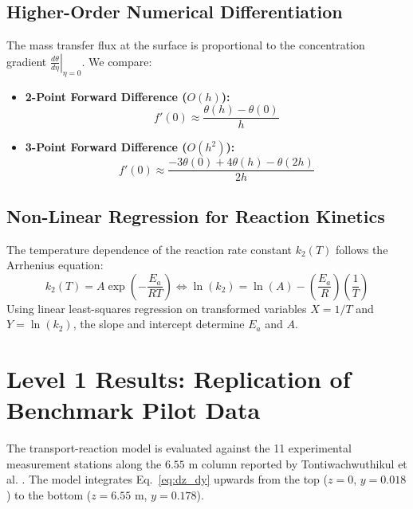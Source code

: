 \documentclass[11pt,a4paper]{article}
\begin{document}
\subsection{Higher-Order Numerical Differentiation}
The mass transfer flux at the surface is proportional to the concentration gradient $\left. \frac{d\theta}{d\eta} \right|_{\eta=0}$. We compare:
\begin{itemize}
    \item \textbf{2-Point Forward Difference ($O(h)$):}
    \begin{equation}
    f'(0) \approx \frac{\theta(h) - \theta(0)}{h}
    \end{equation}
    \item \textbf{3-Point Forward Difference ($O(h^2)$):}
    \begin{equation}
    f'(0) \approx \frac{-3\theta(0) + 4\theta(h) - \theta(2h)}{2h}
    \end{equation}
\end{itemize}

\subsection{Non-Linear Regression for Reaction Kinetics}
The temperature dependence of the reaction rate constant $k_2(T)$ follows the Arrhenius equation:
\begin{equation}
k_2(T) = A \exp\left( -\frac{E_a}{R T} \right) \iff \ln(k_2) = \ln(A) - \left( \frac{E_a}{R} \right) \left( \frac{1}{T} \right)
\end{equation}
Using linear least-squares regression on transformed variables $X = 1/T$ and $Y = \ln(k_2)$, the slope and intercept determine $E_a$ and $A$.

\section{Level 1 Results: Replication of Benchmark Pilot Data}
The transport-reaction model is evaluated against the 11 experimental measurement stations along the $6.55\text{ m}$ column reported by Tontiwachwuthikul et al. \cite{tontiwachwuthikul1992co2}. The model integrates Eq.~\eqref{eq:dz_dy} upwards from the top ($z = 0$, $y = 0.018$) to the bottom ($z = 6.55\text{ m}$, $y = 0.178$).
\end{document}

